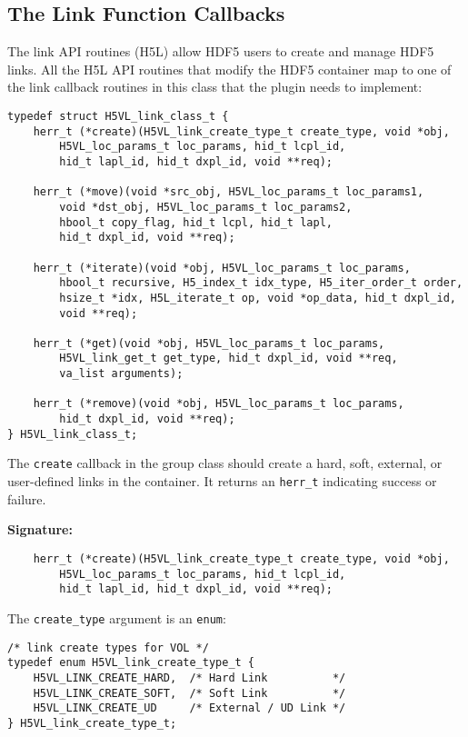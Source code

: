 \subsection{The Link Function Callbacks}
The link API routines (H5L) allow HDF5 users to create and manage
HDF5 links. All the H5L API routines that modify the HDF5 container
map to one of the link callback routines in this class that the
plugin needs to implement:

\begin{lstlisting}
typedef struct H5VL_link_class_t {
    herr_t (*create)(H5VL_link_create_type_t create_type, void *obj,
        H5VL_loc_params_t loc_params, hid_t lcpl_id, 
        hid_t lapl_id, hid_t dxpl_id, void **req);

    herr_t (*move)(void *src_obj, H5VL_loc_params_t loc_params1,
        void *dst_obj, H5VL_loc_params_t loc_params2,
        hbool_t copy_flag, hid_t lcpl, hid_t lapl, 
        hid_t dxpl_id, void **req);

    herr_t (*iterate)(void *obj, H5VL_loc_params_t loc_params, 
        hbool_t recursive, H5_index_t idx_type, H5_iter_order_t order, 
        hsize_t *idx, H5L_iterate_t op, void *op_data, hid_t dxpl_id, 
        void **req);

    herr_t (*get)(void *obj, H5VL_loc_params_t loc_params, 
        H5VL_link_get_t get_type, hid_t dxpl_id, void **req, 
        va_list arguments);

    herr_t (*remove)(void *obj, H5VL_loc_params_t loc_params, 
        hid_t dxpl_id, void **req);
} H5VL_link_class_t;
\end{lstlisting}


The {\tt create} callback in the group class should create a hard,
soft, external, or user-defined links in the container. It returns an
{\tt herr\_t} indicating success or failure.

\textbf{Signature:}
\begin{lstlisting}
    herr_t (*create)(H5VL_link_create_type_t create_type, void *obj,
        H5VL_loc_params_t loc_params, hid_t lcpl_id, 
        hid_t lapl_id, hid_t dxpl_id, void **req);
\end{lstlisting}

The {\tt create\_type} argument is an {\tt enum}:
\begin{lstlisting}
/* link create types for VOL */
typedef enum H5VL_link_create_type_t {
    H5VL_LINK_CREATE_HARD,  /* Hard Link          */
    H5VL_LINK_CREATE_SOFT,  /* Soft Link          */
    H5VL_LINK_CREATE_UD     /* External / UD Link */
} H5VL_link_create_type_t;
\end{lstlisting}

